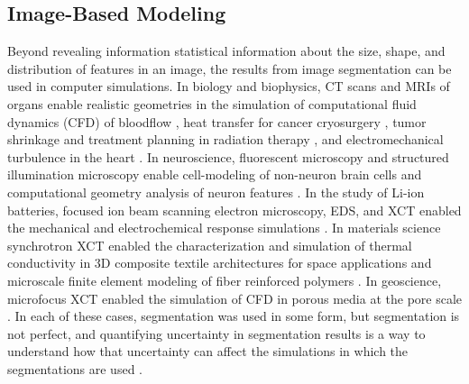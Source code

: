 \subsection{Image-Based Modeling}
Beyond revealing information statistical information about the size,
shape, and distribution of features in an image, the results from image
segmentation can be used in computer simulations. In biology and
biophysics, CT scans and MRIs of organs enable realistic geometries in the
simulation of computational fluid dynamics (CFD) of bloodflow
\cite{Hoeijmakers2019}, heat transfer for cancer cryosurgery
\cite{Zhang2005}, tumor shrinkage and treatment planning in radiation
therapy \cite{Chao2010, Le2016, Rangraz2019}, and electromechanical
turbulence in the heart \cite{Christoph2018}. In neuroscience, fluorescent
microscopy and structured illumination microscopy enable cell-modeling of
non-neuron brain cells \cite{Savtchenko2018} and computational geometry
analysis of neuron features \cite{Kashiwagi2019}. In the study of Li-ion
batteries, focused ion beam scanning electron microscopy, EDS, and XCT
enabled the mechanical and electrochemical response simulations
\cite{Hutzenlaub2014, Mendoza2016, Muller2018, Lu2020}. In materials
science synchrotron XCT enabled the characterization and simulation of
thermal conductivity in 3D composite textile architectures for space
applications \cite{Vanaerschot2017, MacNeil2019, Semeraro2021} and
microscale finite element modeling of fiber reinforced polymers
\cite{Nikishkov2013, Czabaj2014, Sencu2016}. In geoscience, microfocus
XCT enabled the simulation of CFD in porous media at the pore scale
\cite{Shah2016}. In each of these cases, segmentation was used in some
form, but segmentation is not perfect, and quantifying uncertainty in
segmentation results is a way to understand how that uncertainty can
affect the simulations in which the segmentations are used
\cite{Krygier2021, Le2016}.

